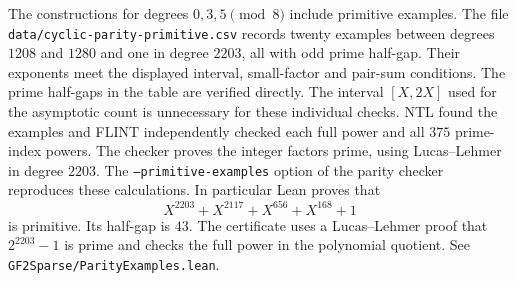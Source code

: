 \documentclass[11pt]{article}
\begin{document}
The constructions for degrees \(0,3,5\pmod8\) include primitive
examples. The file \nolinkurl{data/cyclic-parity-primitive.csv}
records twenty examples between degrees \(1208\) and \(1280\) and one
in degree \(2203\), all with odd prime half-gap. Their exponents meet
the displayed interval, small-factor and pair-sum conditions. The
prime half-gaps in the table are verified directly. The interval
\([X,2X]\) used for the asymptotic count is unnecessary for these
individual checks.
NTL found the examples and FLINT independently checked each full
power and all \(375\) prime-index powers. The checker proves
the integer factors prime, using Lucas--Lehmer in degree \(2203\).
The \texttt{--primitive-examples} option of the parity checker
reproduces these calculations. In particular Lean proves that
\[
 X^{2203}+X^{2117}+X^{656}+X^{168}+1
\]
is primitive. Its half-gap is \(43\). The certificate uses a
Lucas--Lehmer proof that \(2^{2203}-1\) is prime and checks the
full power in the polynomial quotient.
See \nolinkurl{GF2Sparse/ParityExamples.lean}.
\end{document}
